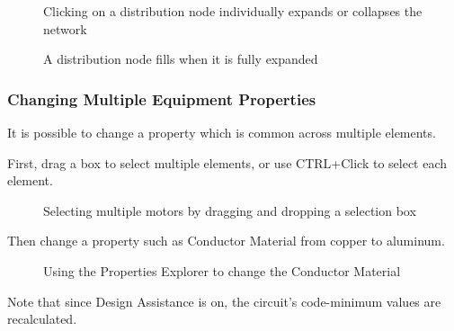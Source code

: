 \documentclass[letterpaper,10pt,english]{sphinxmanual}
\begin{document}
\begin{figure}[H]
\centering
\capstart

\noindent{}
\caption{Clicking on a distribution node individually expands or collapses the network}\label{\detokenize{docs/userguide/buildingelectricalmodel/one-line/index-one-line:id11}}\end{figure}

\begin{figure}[H]
\centering
\capstart

\noindent{}
\caption{A distribution node fills when it is fully expanded}\label{\detokenize{docs/userguide/buildingelectricalmodel/one-line/index-one-line:id12}}\end{figure}


\subsubsection{Changing Multiple Equipment Properties}
\label{\detokenize{docs/userguide/buildingelectricalmodel/one-line/index-one-line:changing-multiple-equipment-properties}}
It is possible to change a property which is common across multiple elements.

First, drag a box to select multiple elements, or use CTRL+Click to select each element.

\begin{figure}[H]
\centering
\capstart

\noindent{}
\caption{Selecting multiple motors by dragging and dropping a selection box}\label{\detokenize{docs/userguide/buildingelectricalmodel/one-line/index-one-line:id13}}\end{figure}

Then change a property such as Conductor Material from copper to aluminum.

\begin{figure}[H]
\centering
\capstart

\noindent{}
\caption{Using the Properties Explorer to change the Conductor Material}\label{\detokenize{docs/userguide/buildingelectricalmodel/one-line/index-one-line:id14}}\end{figure}

Note that since Design Assistance is on, the circuit’s code-minimum values are recalculated.
\end{document}
